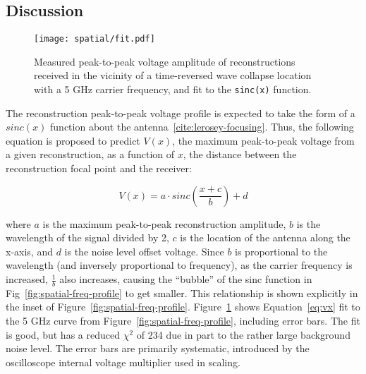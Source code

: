 \subsection{Discussion}

\begin{figure}[t!]
\texttt{[image: spatial/fit.pdf]}
\caption{Measured peak-to-peak voltage amplitude of reconstructions received in the
vicinity of a time-reversed wave collapse location with a 5 GHz carrier
frequency, and fit to the \texttt{sinc(x)} function.}
\label{fig:spatial-error-fit}
\end{figure}

The reconstruction peak-to-peak voltage profile is expected to take the form of a $sinc(x)$ function about the antenna~\ref{cite:lerosey-focusing}. Thus, the following equation is proposed to predict $V(x)$, the maximum peak-to-peak voltage from a given reconstruction, as a function of $x$, the distance between the reconstruction focal point and the receiver:

\begin{equation}
\label{eq:vx}
V(x) = a\cdot sinc\left(\frac{x+c}{b}\right) + d
\end{equation}

where $a$ is the maximum peak-to-peak reconstruction amplitude, $b$ is the wavelength of the signal divided by 2, $c$ is the location of the antenna along the x-axis, and $d$ is the noise level
offset voltage. Since $b$ is proportional to the wavelength (and inversely proportional
to frequency), as the carrier frequency is increased,  $\frac{1}{b}$ also increases, causing the ``bubble'' of the sinc function in Fig~\ref{fig:spatial-freq-profile} to get smaller. This relationship is shown explicitly in the inset of Figure~\ref{fig:spatial-freq-profile}. Figure~\ref{fig:spatial-error-fit} shows Equation~\ref{eq:vx} fit to the 5 GHz curve from Figure~\ref{fig:spatial-freq-profile}, including error bars. The fit is good, but has a reduced $\chi^2$ of 234 due in part to the rather large background noise level. The error bars are primarily systematic, introduced by the oscilloscope internal voltage multiplier used in scaling.
